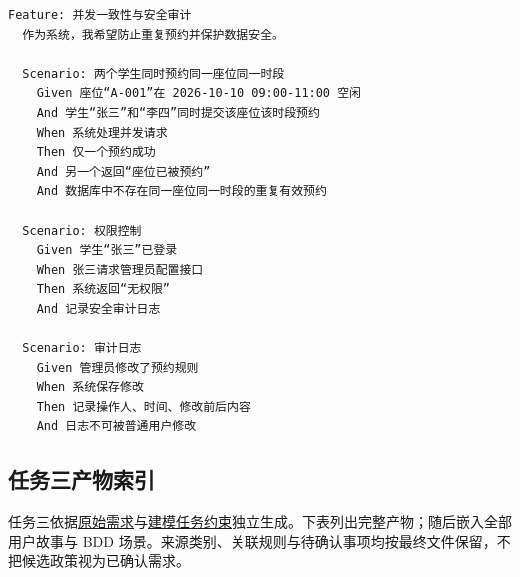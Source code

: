 \documentclass[11pt,a4paper]{article}
\begin{document}
\begin{framed}
\begin{verbatim}
Feature: 并发一致性与安全审计
  作为系统，我希望防止重复预约并保护数据安全。

  Scenario: 两个学生同时预约同一座位同一时段
    Given 座位“A-001”在 2026-10-10 09:00-11:00 空闲
    And 学生“张三”和“李四”同时提交该座位该时段预约
    When 系统处理并发请求
    Then 仅一个预约成功
    And 另一个返回“座位已被预约”
    And 数据库中不存在同一座位同一时段的重复有效预约

  Scenario: 权限控制
    Given 学生“张三”已登录
    When 张三请求管理员配置接口
    Then 系统返回“无权限”
    And 记录安全审计日志

  Scenario: 审计日志
    Given 管理员修改了预约规则
    When 系统保存修改
    Then 记录操作人、时间、修改前后内容
    And 日志不可被普通用户修改
\end{verbatim}
\end{framed}


\clearpage
\subsection{任务三产物索引}\label{app:agentic-artifacts}
任务三依据\href{run:task3/baseline.md}{原始需求}与\href{run:task3/agent-task.md}{建模任务约束}独立生成。下表列出完整产物；随后嵌入全部用户故事与 BDD 场景。来源类别、关联规则与待确认事项均按最终文件保留，不把候选政策视为已确认需求。
\end{document}
